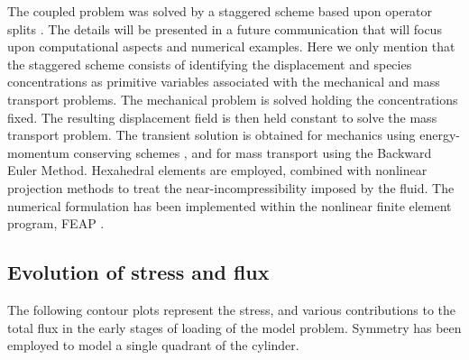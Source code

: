 The coupled problem was solved by a staggered scheme based upon
operator splits \citep{Armero:99,Garikipatietal:01}. The details
will be presented in a future communication that will focus upon
computational aspects and numerical examples. Here we only mention
that the staggered scheme consists of identifying the displacement
and species concentrations as primitive variables associated with
the mechanical and mass transport problems. The mechanical problem
is solved holding the concentrations fixed. The resulting
displacement field is then held constant to solve the mass
transport problem. The transient solution is obtained for
mechanics using energy-momentum conserving schemes
\citep{SimoTarnow:1992b,SimoTarnow:1992a,Gonzalezphd:1996}, and
for mass transport using the Backward Euler Method. Hexahedral
elements are employed, combined with nonlinear projection methods
\citep{simotaylorpister:85} to treat the near-incompressibility
imposed by the fluid. The numerical formulation has been
implemented within the nonlinear finite element program, FEAP
\citep{feapmanual}.

\subsection{Evolution of stress and flux}\label{sect6.3}

The following contour plots represent the stress, and various
contributions to the total flux in the early stages of loading of
the model problem. Symmetry has been employed to model a single
quadrant of the cylinder.

